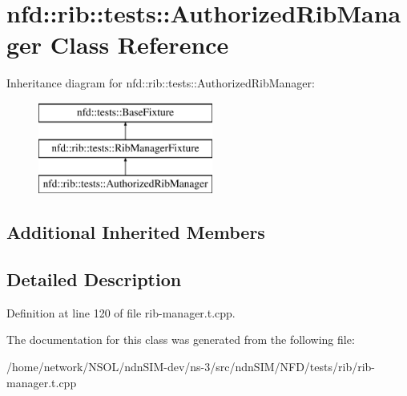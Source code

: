 \hypertarget{classnfd_1_1rib_1_1tests_1_1AuthorizedRibManager}{}\section{nfd\+:\+:rib\+:\+:tests\+:\+:Authorized\+Rib\+Manager Class Reference}
\label{classnfd_1_1rib_1_1tests_1_1AuthorizedRibManager}
Inheritance diagram for nfd\+:\+:rib\+:\+:tests\+:\+:Authorized\+Rib\+Manager\+:\begin{figure}[H]
\begin{center}
\leavevmode
\includegraphics[height=3.000000cm]{classnfd_1_1rib_1_1tests_1_1AuthorizedRibManager}
\end{center}
\end{figure}
\subsection*{Additional Inherited Members}


\subsection{Detailed Description}


Definition at line 120 of file rib-\/manager.\+t.\+cpp.



The documentation for this class was generated from the following file\+:\begin{DoxyCompactItemize}
\item 
/home/network/\+N\+S\+O\+L/ndn\+S\+I\+M-\/dev/ns-\/3/src/ndn\+S\+I\+M/\+N\+F\+D/tests/rib/rib-\/manager.\+t.\+cpp\end{DoxyCompactItemize}

